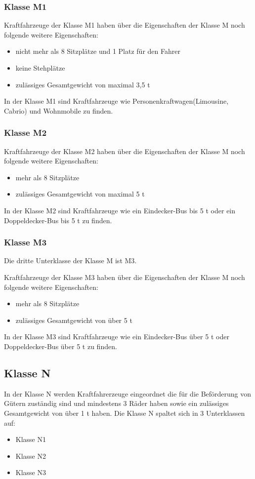 \subsubsection{Klasse M1}
Kraftfahrzeuge der Klasse M1 haben über die Eigenschaften der Klasse M noch folgende weitere Eigenschaften:
\begin{itemize}
	\item {nicht mehr als 8 Sitzplätze und 1 Platz für den Fahrer}
	\item {keine Stehplätze}
	\item {zulässiges Gesamtgewicht von maximal 3,5 \ac{t}}
\end{itemize}

In der Klasse M1 sind Kraftfahrzeuge wie Personenkraftwagen(Limousine, Cabrio) und Wohnmobile zu finden.

\subsubsection{Klasse M2}
Kraftfahrzeuge der Klasse M2 haben über die Eigenschaften der Klasse M noch folgende weitere Eigenschaften:
\begin{itemize}
	\item {mehr als 8 Sitzplätze}
	\item {zulässiges Gesamtgewicht von maximal 5 \ac{t}}
\end{itemize}

In der Klasse M2 sind Kraftfahrzeuge wie ein Eindecker-Bus bis 5 \ac{t} oder ein Doppeldecker-Bus bis 5 \ac{t} zu finden.

\subsubsection{Klasse M3}

Die dritte Unterklasse der Klasse M ist M3.

Kraftfahrzeuge der Klasse M3 haben über die Eigenschaften der Klasse M noch folgende weitere Eigenschaften:
\begin{itemize}
	\item {mehr als 8 Sitzplätze}
	\item {zulässiges Gesamtgewicht von über 5 \ac{t}}
\end{itemize}

In der Klasse M3 sind Kraftfahrzeuge wie ein Eindecker-Bus über 5 \ac{t} oder Doppeldecker-Bus über 5 \ac{t} zu finden.

\subsection*{Klasse N}
In der Klasse N werden Kraftfahrerzeuge eingeordnet die für die Beförderung von Gütern zuständig sind und mindestens 3 Räder haben sowie ein zulässiges Gesamtgewicht von über 1 \ac{t} haben.
Die Klasse N spaltet sich in 3 Unterklassen auf:
\begin{itemize}
	\item {Klasse N1}
	\item {Klasse N2}
	\item {Klasse N3}
\end{itemize}

